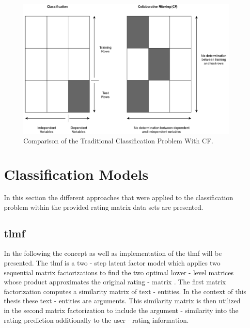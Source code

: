 \begin{figure}[!ht]
    \centering
    \includegraphics[width=1\textwidth]{images/CFvsClassification2.jpg}
    \caption{Comparison of the Traditional Classification Problem With CF.}
    \label{fig:CFvsClassification}
\end{figure}

\section{Classification Models}

In this section the different approaches that were applied to the classification problem within the provided rating matrix data sets are presented. 

\subsection{\acrfull{tlmf}}
In the following the concept as well as implementation of the \acrshort{tlmf} will be presented.
The \acrshort{tlmf} is a two - step latent factor model which applies two sequential matrix factorizations 
to find the two optimal lower - level matrices whose product approximates the original rating - matrix \cite{li2016two}.
The first matrix factorization computes a similarity matrix of text - entities.
In the context of this thesis these text - entities are arguments. This similarity matrix is then utilized in the second
matrix factorization to include the argument - similarity into the rating prediction additionally to the user - rating information.

